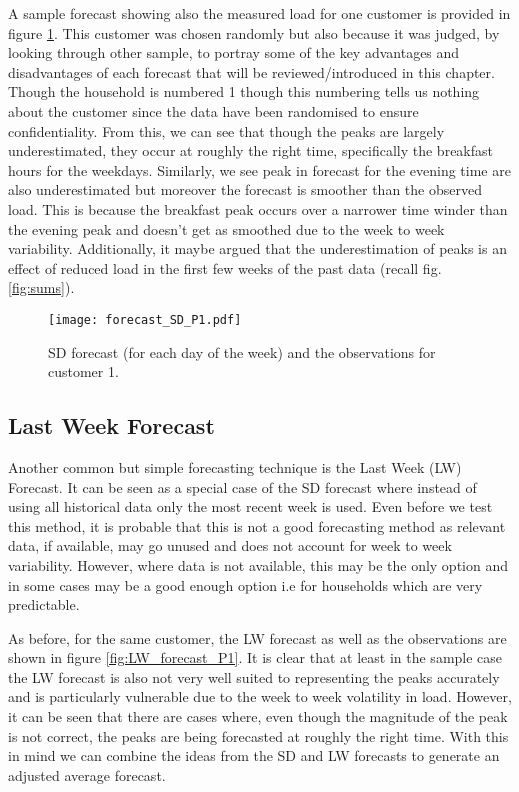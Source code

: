 A sample forecast showing also the measured load for one customer is provided in figure \ref{fig:SDforecast}. This customer was chosen randomly but also because it was judged, by looking through other sample, to portray some of the key advantages and disadvantages of each forecast that will be reviewed/introduced in this chapter. Though the household is numbered 1 though this numbering tells us nothing about the customer since the data have been randomised to ensure confidentiality. From this, we can see that though the peaks are largely underestimated, they occur at roughly the right time, specifically the breakfast hours for the weekdays. Similarly, we see peak in forecast for the evening time are also underestimated but moreover the forecast is smoother than the observed load. This is because the breakfast peak occurs over a narrower time winder than the evening peak and doesn't get as smoothed due to the week to week variability. Additionally, it maybe argued that the underestimation of peaks is an effect of reduced load in the first few weeks of the past data (recall fig. \ref{fig:sums}).

\begin{figure}
\centering
\texttt{[image: forecast\_SD\_P1.pdf]}
\caption{SD forecast (for each day of the week) and the observations for customer 1.}
\label{fig:SDforecast} 
\end{figure}

\subsection{Last Week Forecast}

Another common but simple forecasting technique is the Last Week (LW) Forecast. It can be seen as a special case of the SD forecast where instead of using all historical data only the most recent week is used. Even before we test this method, it is probable that this is not a good forecasting method as relevant data, if available, may go unused and does not account for week to week variability. However, where data is not available, this may be the only option and in some cases may be a good enough option i.e for households which are very predictable.

As before, for the same customer, the LW forecast as well as the observations are shown in figure \ref{fig:LW_forecast_P1}. It is clear that at least in the sample case the LW forecast is also not very well suited to representing the peaks accurately and is particularly vulnerable due to the week to week volatility in load. However, it can be seen that there are cases where, even though the magnitude of the peak is not correct, the peaks are being forecasted at roughly the right time. With this in mind we can combine the ideas from the SD and LW forecasts to generate an adjusted average forecast.

